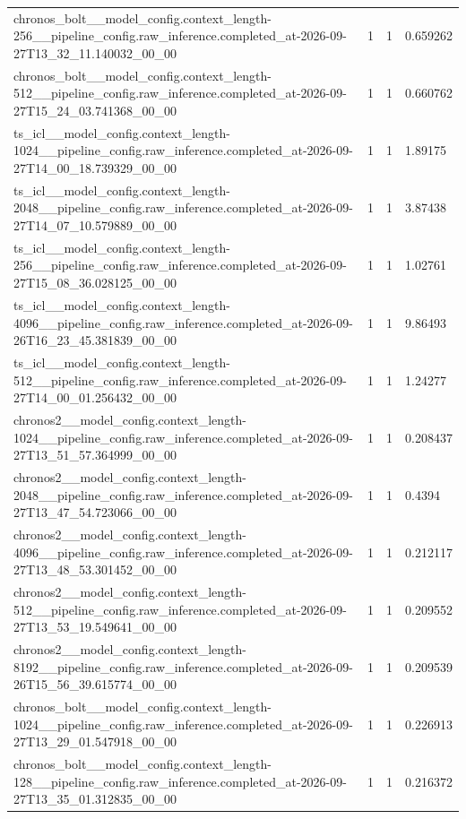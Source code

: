 \begin{tabular}{llll}
chronos\_bolt\_\_model\_config.context\_length-256\_\_pipeline\_config.raw\_inference.completed\_at-2026-09-27T13\_32\_11.140032\_00\_00 & 1 & 1 & 0.659262 \\
chronos\_bolt\_\_model\_config.context\_length-512\_\_pipeline\_config.raw\_inference.completed\_at-2026-09-27T15\_24\_03.741368\_00\_00 & 1 & 1 & 0.660762 \\
ts\_icl\_\_model\_config.context\_length-1024\_\_pipeline\_config.raw\_inference.completed\_at-2026-09-27T14\_00\_18.739329\_00\_00 & 1 & 1 & 1.89175 \\
ts\_icl\_\_model\_config.context\_length-2048\_\_pipeline\_config.raw\_inference.completed\_at-2026-09-27T14\_07\_10.579889\_00\_00 & 1 & 1 & 3.87438 \\
ts\_icl\_\_model\_config.context\_length-256\_\_pipeline\_config.raw\_inference.completed\_at-2026-09-27T15\_08\_36.028125\_00\_00 & 1 & 1 & 1.02761 \\
ts\_icl\_\_model\_config.context\_length-4096\_\_pipeline\_config.raw\_inference.completed\_at-2026-09-26T16\_23\_45.381839\_00\_00 & 1 & 1 & 9.86493 \\
ts\_icl\_\_model\_config.context\_length-512\_\_pipeline\_config.raw\_inference.completed\_at-2026-09-27T14\_00\_01.256432\_00\_00 & 1 & 1 & 1.24277 \\
chronos2\_\_model\_config.context\_length-1024\_\_pipeline\_config.raw\_inference.completed\_at-2026-09-27T13\_51\_57.364999\_00\_00 & 1 & 1 & 0.208437 \\
chronos2\_\_model\_config.context\_length-2048\_\_pipeline\_config.raw\_inference.completed\_at-2026-09-27T13\_47\_54.723066\_00\_00 & 1 & 1 & 0.4394 \\
chronos2\_\_model\_config.context\_length-4096\_\_pipeline\_config.raw\_inference.completed\_at-2026-09-27T13\_48\_53.301452\_00\_00 & 1 & 1 & 0.212117 \\
chronos2\_\_model\_config.context\_length-512\_\_pipeline\_config.raw\_inference.completed\_at-2026-09-27T13\_53\_19.549641\_00\_00 & 1 & 1 & 0.209552 \\
chronos2\_\_model\_config.context\_length-8192\_\_pipeline\_config.raw\_inference.completed\_at-2026-09-26T15\_56\_39.615774\_00\_00 & 1 & 1 & 0.209539 \\
chronos\_bolt\_\_model\_config.context\_length-1024\_\_pipeline\_config.raw\_inference.completed\_at-2026-09-27T13\_29\_01.547918\_00\_00 & 1 & 1 & 0.226913 \\
chronos\_bolt\_\_model\_config.context\_length-128\_\_pipeline\_config.raw\_inference.completed\_at-2026-09-27T13\_35\_01.312835\_00\_00 & 1 & 1 & 0.216372 \\

\end{tabular}
